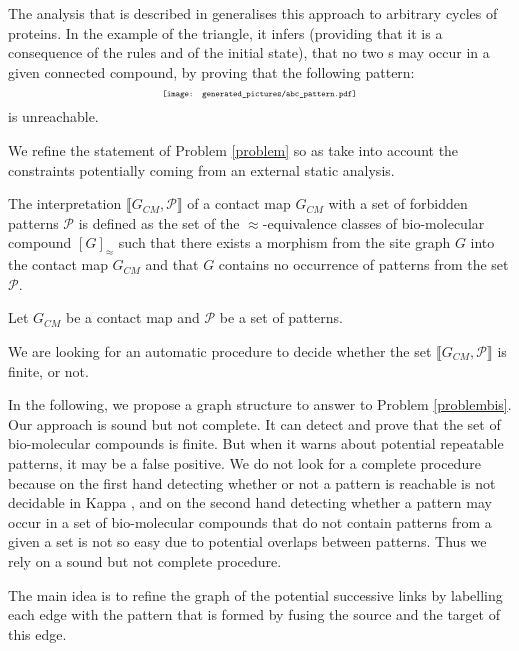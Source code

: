\documentclass{entcs}
\newcommand{\graphsymb}{G}
\newcommand{\iso}{\approx}
\begin{document}
The analysis that is described in \cite{afp} generalises this approach to arbitrary cycles of proteins. In the example of the triangle, it infers (providing that it is a consequence of the rules and of the initial state), that no two s may occur in a given connected compound, by proving that the following pattern:
\begin{equation*}
\scalebox{0.6}{\texttt{[image: generated\_pictures/abc\_pattern.pdf]}}
\end{equation*}
is unreachable.

We refine the statement of Problem \ref{problem} so as take into account the constraints potentially coming from an external static analysis.


\begin{defn}
The interpretation $\llbracket \graphsymb_{\textit{CM}}, \mathcal{P}\rrbracket$ of a contact map $\graphsymb_{\textit{CM}}$ with a set of forbidden patterns $\mathcal{P}$ is defined as the set of the $\iso$-equivalence classes of bio-molecular compound $[G]_{\iso}$ such that there exists a morphism from the site graph $G$ into the contact map $\graphsymb_{\textit{CM}}$ and that $G$ contains no occurrence of patterns from the set $\mathcal{P}$.
\end{defn}
\begin{problem}\label{problembis}
Let $\graphsymb_{\textit{CM}}$ be a contact map and $\mathcal{P}$ be a set of patterns.

We are looking for an automatic procedure to decide whether
the set $\llbracket \graphsymb_{\textit{CM}},\mathcal{P} \rrbracket$ is finite, or not.
\end{problem}

In the following, we propose a graph structure to answer to Problem \ref{problembis}. Our approach is sound but not complete. It can detect and prove that the set of bio-molecular compounds is finite. But when it warns about potential repeatable patterns, it may be a false positive. We do not look for a complete procedure because on the first hand detecting whether or not a pattern is reachable is not decidable in Kappa \cite{kreyBig}, and on the second hand detecting whether a pattern may occur in a set of bio-molecular compounds that do not contain patterns from a given a set is not so easy due to potential overlaps between patterns. Thus we rely on a sound but not complete procedure.

The main idea is to refine the graph of the potential successive links by labelling each edge with the pattern that is formed by fusing the source and the target of this edge.
\end{document}
